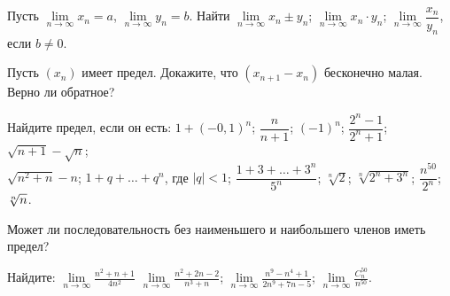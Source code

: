 \documentclass[a4paper,11pt]{article}
\begin{document}


Пусть
$\lim\limits_{n \to \infty} x_n = a$,
$\lim\limits_{n \to \infty} y_n = b$.
Найти
 $\lim\limits_{n \to \infty} x_n \pm y_n$;
 $\lim\limits_{n \to \infty} x_n\cdot y_n$;
$\lim\limits_{n \to \infty}\dfrac{x_n}{y_n}$, если $b\ne0$.

 Пусть
$(x_n)$ %
имеет предел.
Докажите, что %
$(x_{n+1}-x_n)$ бесконечно малая.
 Верно ли обратное?

 Найдите предел, если он есть:
 \hbox{$1+(-0,1)^n$;}
 $\dfrac{n}{n+1}$;
 $(-1)^n$;
 $\dfrac{2^n-1}{2^n+1}$;
 $\sqrt{n+1}-\sqrt{n}$;\\
 $\sqrt{n^2+n}-n$;
 $1+q+\ldots+q^{n}$, где $|q|<1$;
 $\dfrac{1+3+\ldots+3^n}{5^{n}}$;
 $\sqrt[n]{2}$;
 $\sqrt[n]{2^n+3^n}$;
 $\dfrac{n^{50}}{2^n}$;
 $\root n \of n$.


Может ли последовательность без наименьшего и
наибольшего членов иметь предел?



 Найдите: %
 $\displaystyle{\lim\limits_{n \to \infty}\frac{n^2+n+1}{4n^2}}$
 $\displaystyle{\lim\limits_{n \to \infty}\frac{n^2+2n-2}{n^3+n}}$;
 $\displaystyle{\lim\limits_{n \to \infty}\frac{n^9-n^4+1}{2n^9+7n-5}}$;
 $\displaystyle{\lim\limits_{n \to \infty}\frac{C^{50}_n}{n^{50}}}$.
\end{document}
